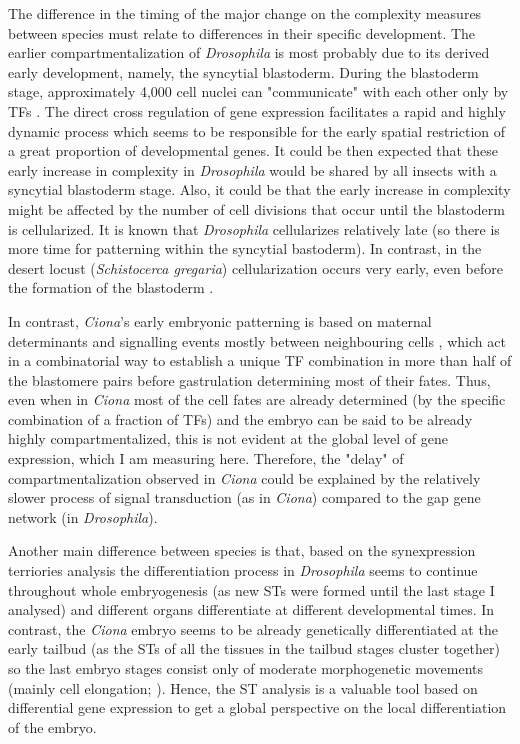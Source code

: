 The difference in the timing of the major change on the complexity measures between species must relate to differences in their specific development.
The earlier compartmentalization of \textit{Drosophila} is most probably due to its derived early development, namely, the syncytial blastoderm. 
During the blastoderm stage, approximately 4,000 cell nuclei can "communicate" with each other only by TFs \citep{Jaeger2011}. The direct cross regulation of gene expression facilitates a rapid and highly dynamic process which seems to be responsible for the early spatial restriction of a great proportion of developmental genes.
It could be then expected that these early increase in complexity in \textit{Drosophila} would be shared by all insects with a syncytial blastoderm stage. Also, it could be that the early increase in complexity might be affected by the number of cell divisions that occur until the blastoderm is cellularized. It is known that \textit{Drosophila} cellularizes relatively late (so there is more time for patterning within the syncytial bastoderm). In contrast, in the desert locust (\textit{Schistocerca gregaria}) cellularization occurs very early, even before the formation of the blastoderm \citep{Ho1997}.

In contrast,  \textit{Ciona}'s early embryonic patterning is based on maternal determinants and signalling events mostly between neighbouring cells \citep{Lemaire2009}, which act in a combinatorial way \citep{Hudson2007} to establish a unique TF combination in more than half of the blastomere pairs before gastrulation \citep{Imai2006} determining most of their fates.
Thus, even when in \textit{Ciona} most of the cell fates are already determined (by the specific combination of a fraction of TFs) and the embryo can be said to be already highly compartmentalized, this is not evident at the global level of gene expression, which I am measuring here.
Therefore, the "delay" of compartmentalization observed in \textit{Ciona} could be explained by the relatively slower process of signal transduction (as in \textit{Ciona}) compared to the gap gene network (in \textit{Drosophila}).

Another main difference between species is that, based on the synexpression terriories analysis the differentiation process in \textit{Drosophila} seems to continue throughout whole embryogenesis (as new STs were formed until the last stage I analysed) and different organs differentiate at different developmental times.
In contrast, the \textit{Ciona} embryo seems to be already genetically differentiated at the early tailbud (as the STs of all the tissues in the tailbud stages cluster together) so the last embryo stages consist only of moderate morphogenetic movements (mainly cell elongation; \citealp{Hotta2007}).
Hence, the ST analysis is a valuable tool based on differential gene expression to get a global perspective on the local differentiation of the embryo.